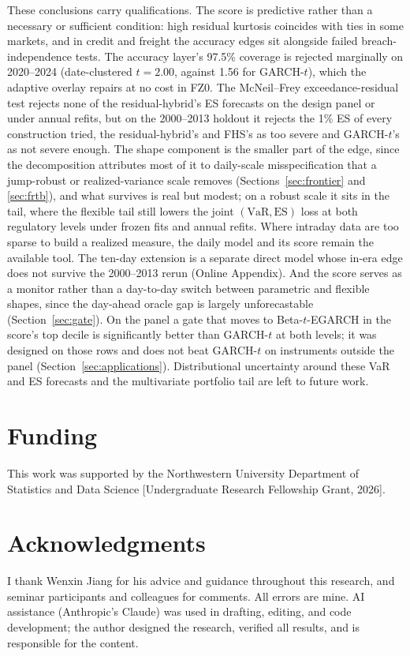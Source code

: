 \documentclass[11pt]{article}
\newcommand{\VaR}{\mathrm{VaR}}
\newcommand{\ES}{\mathrm{ES}}
\theoremstyle{remark}
\begin{document}
These conclusions carry qualifications. The score is predictive rather than a necessary or sufficient condition: high residual kurtosis coincides with ties in some markets, and in credit and freight the accuracy edges sit alongside failed breach-independence tests. The accuracy layer's 97.5\% coverage is rejected marginally on 2020--2024 (date-clustered $t=2.00$, against 1.56 for GARCH-$t$), which the adaptive overlay repairs at no cost in FZ0. The McNeil--Frey exceedance-residual test rejects none of the residual-hybrid's ES forecasts on the design panel or under annual refits, but on the 2000--2013 holdout it rejects the 1\% ES of every construction tried, the residual-hybrid's and FHS's as too severe and GARCH-$t$'s as not severe enough. The shape component is the smaller part of the edge, since the decomposition attributes most of it to daily-scale misspecification that a jump-robust or realized-variance scale removes (Sections~\ref{sec:frontier} and \ref{sec:frtb}), and what survives is real but modest; on a robust scale it sits in the tail, where the flexible tail still lowers the joint $(\VaR,\ES)$ loss at both regulatory levels under frozen fits and annual refits. Where intraday data are too sparse to build a realized measure, the daily model and its score remain the available tool. The ten-day extension is a separate direct model whose in-era edge does not survive the 2000--2013 rerun (Online Appendix). And the score serves as a monitor rather than a day-to-day switch between parametric and flexible shapes, since the day-ahead oracle gap is largely unforecastable (Section~\ref{sec:gate}). On the panel a gate that moves to Beta-$t$-EGARCH in the score's top decile is significantly better than GARCH-$t$ at both levels; it was designed on those rows and does not beat GARCH-$t$ on instruments outside the panel (Section~\ref{sec:applications}).
Distributional uncertainty around these VaR and ES forecasts and the multivariate portfolio tail are left to future work.

\section*{Funding}
This work was supported by the Northwestern University Department of
Statistics and Data Science [Undergraduate Research Fellowship Grant,
2026].

\section*{Acknowledgments}
I thank Wenxin Jiang for his advice and guidance throughout this
research, and seminar participants and colleagues for comments. All
errors are mine.
AI assistance (Anthropic's Claude) was used in drafting, editing, and
code development; the author designed the research, verified all
results, and is responsible for the content.
\end{document}
